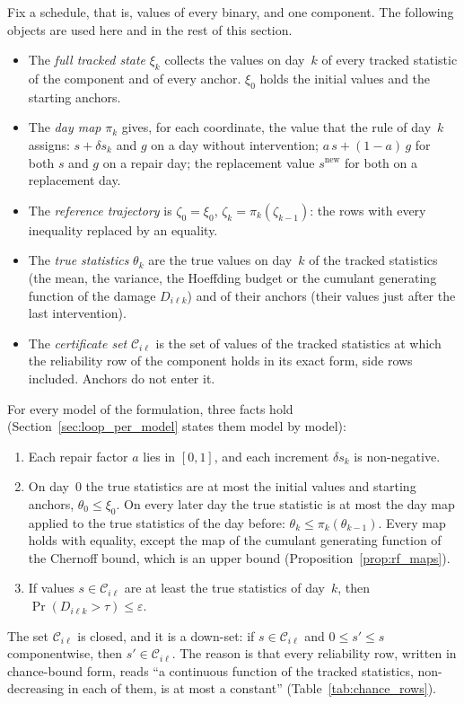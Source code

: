 \documentclass[11pt,a4paper]{article}
\theoremstyle{plain}
\theoremstyle{definition}
\theoremstyle{remark}
\begin{document}
Fix a schedule, that is, values of every binary, and one component.
The following objects are used here and in the rest of this section.
\begin{itemize}[nosep]
  \item The \emph{full tracked state} $\xi_k$ collects the values on day~$k$ of every tracked statistic of the component and of every anchor.
    $\xi_0$ holds the initial values and the starting anchors.
  \item The \emph{day map} $\pi_k$ gives, for each coordinate, the value that the rule of day~$k$ assigns: $s + \delta s_k$ and $g$ on a day without intervention; $a\,s + (1-a)\,g$ for both $s$ and $g$ on a repair day; the replacement value $s^{\mathrm{new}}$ for both on a replacement day.
  \item The \emph{reference trajectory} is $\zeta_0 = \xi_0$, $\zeta_k = \pi_k(\zeta_{k-1})$: the rows with every inequality replaced by an equality.
  \item The \emph{true statistics} $\theta_k$ are the true values on day~$k$ of the tracked statistics (the mean, the variance, the Hoeffding budget or the cumulant generating function of the damage $D_{i\ell k}$) and of their anchors (their values just after the last intervention).
  \item The \emph{certificate set} $\mathcal{C}_{i\ell}$ is the set of values of the tracked statistics at which the reliability row of the component holds in its exact form, side rows included.
    Anchors do not enter it.
\end{itemize}

For every model of the formulation, three facts hold (Section~\ref{sec:loop_per_model} states them model by model):
\begin{enumerate}[nosep,label=(M\arabic*)]
  \item Each repair factor $a$ lies in $[0,1]$, and each increment $\delta s_k$ is non-negative.
  \item On day~$0$ the true statistics are at most the initial values and starting anchors, $\theta_0 \le \xi_0$.
    On every later day the true statistic is at most the day map applied to the true statistics of the day before: $\theta_k \le \pi_k(\theta_{k-1})$.
    Every map holds with equality, except the map of the cumulant generating function of the Chernoff bound, which is an upper bound (Proposition~\ref{prop:rf_maps}).
  \item If values $s \in \mathcal{C}_{i\ell}$ are at least the true statistics of day~$k$, then $\Pr(D_{i\ell k} > \tau) \le \varepsilon$.
\end{enumerate}
The set $\mathcal{C}_{i\ell}$ is closed, and it is a down-set: if $s \in \mathcal{C}_{i\ell}$ and $0 \le s' \le s$ componentwise, then $s' \in \mathcal{C}_{i\ell}$.
The reason is that every reliability row, written in chance-bound form, reads ``a continuous function of the tracked statistics, non-decreasing in each of them, is at most a constant'' (Table~\ref{tab:chance_rows}).
\end{document}
